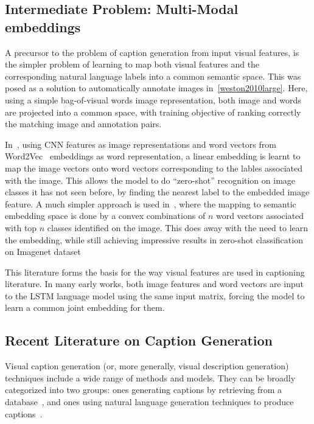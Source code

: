 \subsection{Intermediate Problem: Multi-Modal embeddings}
A precursor to the problem of caption generation from input visual features, is
the simpler problem of learning to map both visual features and the
corresponding natural language labels into a common semantic space.
This was posed as a solution to automatically annotate images
in~\ref{weston2010large}.
Here, using a simple bag-of-visual words image representation, both image and
words are projected into a common space, with training objective of ranking
correctly the matching image and annotation pairs. 

In~\cite{frome2013devise}, using CNN features as image representations and
word vectors from Word2Vec~\cite{mikolov2013distributed} embeddings as word
representation, a linear embedding is learnt to map the image vectors onto
word vectors corresponding to the lables associated with the image.
This allows the model to do ``zero-shot'' recognition on image classes it has
not seen before, by finding the nearest label to the embedded image feature.
A much simpler approach is used in~\cite{norouzi2013zero}, where the mapping to
semantic embedding space is done by a convex combinations of $n$ word vectors
associated with top $n$ classes identified on the image.
This does away with the need to learn the embedding, while still achieving
impressive results in zero-shot classification on Imagenet dataset

This literature forms the basis for the way visual features are used in
captioning literature.
In many early works, both image features and word vectors are input to the LSTM
language model using the same input matrix, forcing the model to learn a common
joint embedding for them.

\subsection{Recent Literature on Caption Generation}
Visual caption generation (or, more generally, visual description generation)
techniques include a wide range of methods and models.
They can be broadly categorized into two groups: ones generating captions by
retrieving from a database~\cite{Farhadi2010, Hodosh2013,Karpathy2014},
and ones using natural language generation techniques to produce
captions~\cite{Li2011,kulkarni2013babytalk,Vinyals_2015_CVPR,Fang2015}.

